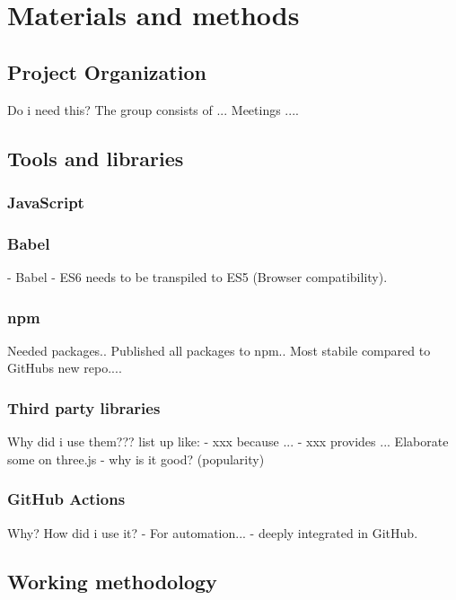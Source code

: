 \chapter[Method]{Materials and methods}



\section{Project Organization}
Do i need this?
The group consists of ...
Meetings ....


\section{Tools and libraries}
\subsection{JavaScript}

\subsection{Babel}
- Babel - ES6 needs to be transpiled to ES5 (Browser compatibility).
\subsection{npm}
Needed packages.. Published all packages to npm.. Most stabile compared to GitHubs new repo....

\subsection{Third party libraries}
Why did i use them???
list up like:
- xxx because ...
- xxx provides ...
Elaborate some on three.js - why is it good? (popularity)

\subsection{GitHub Actions}
Why? How did i use it? - For automation... - deeply integrated in GitHub.

\section{Working methodology}

